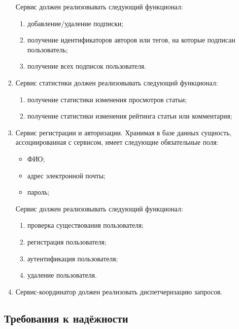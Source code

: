 \documentclass{bmstu-gost-7-32}
\begin{document}
\begin{enumerate}
\begin{itemize}
	\end{itemize}
	Сервис должен реализовывать следующий функционал:
	\begin{enumerate}
		\item добавление/удаление подписки;
		\item получение идентификаторов авторов или тегов, на которые подписан пользователь;
		\item получение всех подписок пользователя.
	\end{enumerate}
	\item Сервис статистики должен реализовывать следующий функционал:
	\begin{enumerate}
		\item получение статистики изменения просмотров статьи;
		\item получение статистики изменения рейтинга статьи или комментария;
	\end{enumerate}
	\item Сервис регистрации и авторизации.
	Хранимая в базе данных сущность, ассоциированная с сервисом, имеет следующие обязательные поля:
	\begin{itemize}
		\item ФИО;
		\item адрес электронной почты;
		\item пароль;
	\end{itemize}
	Сервис должен реализовывать следующий функционал:
	\begin{enumerate}
		\item проверка существования пользователя;
		\item регистрация пользователя;
		\item аутентификация пользователя;
		\item удаление пользователя.
	\end{enumerate}
	\item Сервис-координатор должен реализовать диспетчеризацию запросов.
\end{enumerate}

\subsection{Требования к надёжности}

\end{document}
